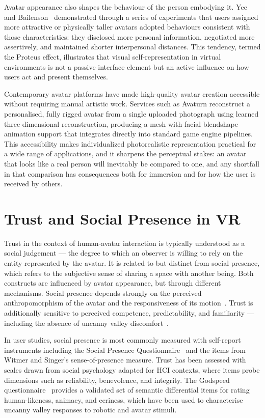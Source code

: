 Avatar appearance also shapes the behaviour of the person embodying it. Yee and Bailenson~\cite{yee2007} demonstrated through a series of experiments that users assigned more attractive or physically taller avatars adopted behaviours consistent with those characteristics: they disclosed more personal information, negotiated more assertively, and maintained shorter interpersonal distances. This tendency, termed the Proteus effect, illustrates that visual self-representation in virtual environments is not a passive interface element but an active influence on how users act and present themselves.

Contemporary avatar platforms have made high-quality avatar creation accessible without requiring manual artistic work. Services such as Avaturn reconstruct a personalised, fully rigged avatar from a single uploaded photograph using learned three-dimensional reconstruction, producing a mesh with facial blendshape animation support that integrates directly into standard game engine pipelines. This accessibility makes individualized photorealistic representation practical for a wide range of applications, and it sharpens the perceptual stakes: an avatar that looks like a real person will inevitably be compared to one, and any shortfall in that comparison has consequences both for immersion and for how the user is received by others.

\section{Trust and Social Presence in VR}
\label{sec:background_trust}

Trust in the context of human-avatar interaction is typically understood as a social judgement — the degree to which an observer is willing to rely on the entity represented by the avatar. It is related to but distinct from social presence, which refers to the subjective sense of sharing a space with another being. Both constructs are influenced by avatar appearance, but through different mechanisms. Social presence depends strongly on the perceived anthropomorphism of the avatar and the responsiveness of its motion~\cite{nowak2003}. Trust is additionally sensitive to perceived competence, predictability, and familiarity — including the absence of uncanny valley discomfort~\cite{mori1970}.

In user studies, social presence is most commonly measured with self-report instruments including the Social Presence Questionnaire~\cite{nowak2003} and the items from Witmer and Singer's sense-of-presence measure. Trust has been assessed with scales drawn from social psychology adapted for HCI contexts, where items probe dimensions such as reliability, benevolence, and integrity. The Godspeed questionnaire~\cite{macdorman2006} provides a validated set of semantic differential items for rating human-likeness, animacy, and eeriness, which have been used to characterise uncanny valley responses to robotic and avatar stimuli.

